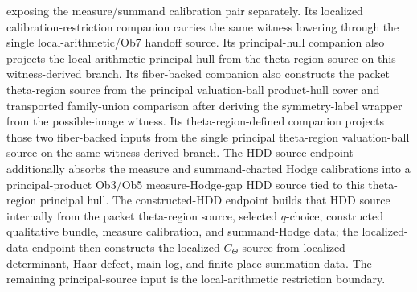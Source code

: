 \begin{definition}
  exposing the measure/summand calibration pair separately.  Its localized
  calibration-restriction companion carries the same witness lowering through
  the single local-arithmetic/Ob7 handoff source.  Its principal-hull companion
  also projects the local-arithmetic principal hull from the theta-region
  source on this witness-derived branch.  Its fiber-backed companion also
  constructs the packet theta-region source from the principal valuation-ball
  product-hull cover and transported family-union comparison after deriving the
  symmetry-label wrapper from the possible-image witness.  Its theta-region-defined
  companion projects those two fiber-backed inputs from the single principal
  theta-region valuation-ball source on the same witness-derived branch.  The HDD-source endpoint additionally
  absorbs the measure and summand-charted Hodge calibrations into a
  principal-product Ob3/Ob5 measure-Hodge-gap HDD source tied to this
  theta-region principal hull.  The constructed-HDD endpoint builds that HDD
  source internally from the packet theta-region source, selected \(q\)-choice,
  constructed qualitative bundle, measure calibration, and summand-Hodge data;
  the localized-data endpoint then constructs the localized \(C_\Theta\) source
  from localized determinant, Haar-defect, main-log, and finite-place summation
  data.  The remaining principal-source input is the local-arithmetic
  restriction boundary.
\end{definition}

